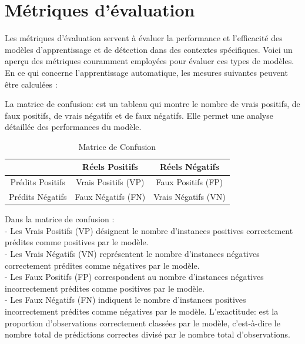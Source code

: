 \section{Métriques d'évaluation}

Les métriques d'évaluation servent à évaluer la performance et l'efficacité des modèles d'apprentissage et de détection dans des contextes spécifiques. Voici un aperçu des métriques couramment employées pour évaluer ces types de modèles. 
En ce qui concerne l'apprentissage automatique, les mesures suivantes peuvent être calculées \cite{moov-ai-blog} :

\begin{outline}
\1 La matrice de confusion: est un  tableau qui montre le nombre de vrais positifs, de faux positifs, de vrais négatifs  et de faux négatifs. Elle permet une analyse détaillée des performances du modèle.

\begin{table}[h]
\centering
\begin{tabular}{|c|c|c|}
\hline
                 &  Réels Positifs    & Réels Négatifs     \\
\hline
Prédits Positifs & Vrais Positifs (VP) & Faux Positifs (FP) \\
\hline
Prédits Négatifs & Faux Négatifs (FN) & Vrais Négatifs (VN) \\
\hline
\end{tabular}
\caption{Matrice de Confusion}
\end{table}

Dans la matrice de confusion :\\
- Les Vrais Positifs (VP) désignent le nombre d'instances positives correctement prédites comme positives par le modèle.\\
- Les Vrais Négatifs (VN) représentent le nombre d'instances négatives correctement prédites comme négatives par le modèle.\\
- Les Faux Positifs (FP) correspondent au nombre d'instances négatives incorrectement prédites comme positives par le modèle.\\
- Les Faux Négatifs (FN) indiquent le nombre d'instances positives incorrectement prédites comme négatives par le modèle.
\1 L'exactitude: est la proportion d'observations correctement classées par le modèle, c'est-à-dire le nombre total de prédictions correctes divisé par le nombre total d'observations.


\end{outline}
